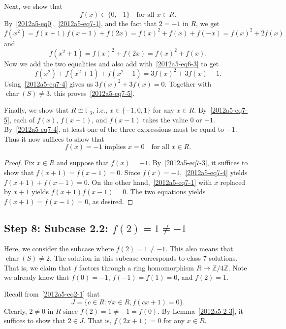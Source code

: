 \documentclass{article}
\newcommand{\F}{\mathbb{F}}
\newcommand{\Z}{\mathbb{Z}}
\DeclareMathOperator{\rchar}{char}
\begin{document}
Next, we show that
\[ f(x) \in \{0, -1\} \quad \text{for all } x \in R. \tag{7.5}\label{2012a5-eq7-5} \]
By~\eqref{2012a5-eq0},~\eqref{2012a5-eq7-1}, and the fact that $2 = -1$ in $R$, we get
\[ f(x^2) = f(x + 1) f(x - 1) + f(2x) = f(x)^2 + f(x) + f(-x) = f(x)^2 + 2 f(x) \]
    and
\[ f(x^2 + 1) = f(x)^2 + f(2x) = f(x)^2 + f(x). \]
Now we add the two equalities and also add with~\eqref{2012a5-eq6-3} to get
\[ f(x^2) + f(x^2 + 1) + f(x^2 - 1) = 3 f(x)^2 + 3 f(x) - 1. \]
Using~\eqref{2012a5-eq7-4} gives us $3 f(x)^2 + 3 f(x) = 0$.
Together with $\rchar(S) \neq 3$, this proves~\eqref{2012a5-eq7-5}.

Finally, we show that $R \cong \F_3$, i.e., $x \in \{-1, 0, 1\}$ for any $x \in R$.
By~\eqref{2012a5-eq7-5}, each of $f(x)$, $f(x + 1)$, and $f(x - 1)$ takes the value $0$ or $-1$.
By~\eqref{2012a5-eq7-4}, at least one of the three expressions must be equal to $-1$.
Thus it now suffices to show that
\[ f(x) = -1 \text{ implies } x = 0 \quad \text{for all } x \in R. \tag{7.6}\label{2012a5-eq7-6} \]

\begin{proof}
Fix $x \in R$ and suppose that $f(x) = -1$.
By~\eqref{2012a5-eq7-3}, it suffices to show that $f(x + 1) = f(x - 1) = 0$.
Since $f(x) = -1$,~\eqref{2012a5-eq7-4} yields $f(x + 1) + f(x - 1) = 0$.
On the other hand,~\eqref{2012a5-eq7-1} with $x$ replaced by $x + 1$ yields $f(x + 1) f(x - 1) = 0$.
The two equations yields $f(x + 1) = f(x - 1) = 0$, as desired.
\end{proof}









\subsection*{Step 8: Subcase 2.2: $f(2) = 1 \neq -1$}

Here, we consider the subcase where $f(2) = 1 \neq -1$.
This also means that $\rchar(S) \neq 2$.
The solution in this subcase corresponds to class 7 solutions.
That is, we claim that $f$ factors through a ring homomorphism $R \to \Z/4\Z$.
Note we already know that $f(0) = -1$, $f(-1) = f(1) = 0$, and $f(2) = 1$.

Recall from~\eqref{2012a5-eq2-1} that
\[ J = \{c \in R : \forall x \in R, f(cx + 1) = 0\}. \]
Clearly, $2 \neq 0$ in $R$ since $f(2) = 1 \neq -1 = f(0)$.
By Lemma~\ref{2012a5-2-3}, it suffices to show that $2 \in J$.
That is, $f(2x + 1) = 0$ for any $x \in R$.
\end{document}
